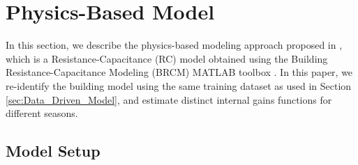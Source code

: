 
\section{Physics-Based Model} \label{sec:Physics_Based_Model}

In this section, we describe the physics-based modeling approach proposed in \cite{Qie}, which is a Resistance-Capacitance (RC) model obtained using the Building Resistance-Capacitance Modeling (BRCM) MATLAB toolbox \cite{David}. 
In this paper, we re-identify the building model using the same training dataset as used in Section \ref{sec:Data_Driven_Model}, and estimate distinct internal gains functions for different seasons.




\subsection{Model Setup}\label{sec:physics_model}

